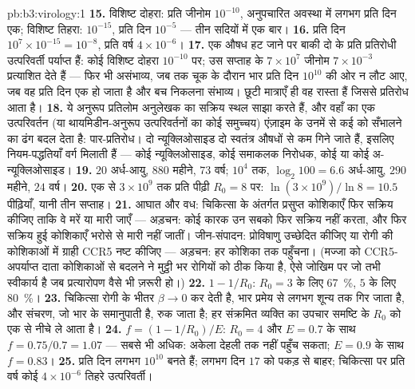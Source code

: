 \begin{solution}{pb:b3:virology:1}
\textbf{15.} विशिष्ट दोहरा: प्रति जीनोम $10^{-10}$, अनुपचारित अवस्था
में लगभग प्रति दिन एक; विशिष्ट तिहरा: $10^{-15}$, प्रति दिन $10^{-5}$
--- तीन सदियों में एक बार।
\textbf{16.} प्रति दिन $10^{7}\times 10^{-15} = 10^{-8}$, प्रति वर्ष
$4\times 10^{-6}$।
\textbf{17.} एक औषध हट जाने पर बाकी दो के प्रति प्रतिरोधी उत्परिवर्ती
पर्याप्त हैं: कोई विशिष्ट दोहरा $10^{-10}$ पर; उस सप्ताह के $7\times 10^{7}$
जीनोम $7\times 10^{-3}$ प्रत्याशित देते हैं --- फिर भी असंभाव्य,
जब तक चूक के दौरान भार प्रति दिन $10^{10}$ की ओर न लौट आए, जब वह प्रति
दिन एक हो जाता है और बच निकलना संभाव्य। छूटी मात्राएँ ही वह रास्ता हैं
जिससे प्रतिरोध आता है।
\textbf{18.} ये अनुरूप प्रतिलोम अनुलेखक का सक्रिय स्थल साझा करते हैं,
और वहाँ का एक उत्परिवर्तन (या थायमिडीन-अनुरूप उत्परिवर्तनों का कोई
समुच्चय) एंज़ाइम के उनमें से कई को सँभालने का ढंग बदल देता है:
पार-प्रतिरोध। दो न्यूक्लिओसाइड दो स्वतंत्र औषधों से कम गिने जाते हैं,
इसलिए नियम-पद्धतियाँ वर्ग मिलाती हैं --- कोई न्यूक्लिओसाइड, कोई समाकलक
निरोधक, कोई  या कोई अ-न्यूक्लिओसाइड।
\textbf{19.} $20$ अर्ध-आयु, $880$ महीने, $73$ वर्ष; $10^{4}$ तक,
$\log_{2}100 = 6.6$ अर्ध-आयु, $290$ महीने, $24$ वर्ष।
\textbf{20.} एक  से $3\times 10^{9}$ तक प्रति पीढ़ी $R_{0} = 8$
पर: $\ln(3\times 10^{9})/\ln 8 = 10.5$ पीढ़ियाँ, यानी तीन सप्ताह।
\textbf{21.} आघात और वध: चिकित्सा के अंतर्गत प्रसुप्त कोशिकाएँ फिर
सक्रिय कीजिए ताकि वे मरें या मारी जाएँ --- अड़चन: कोई कारक उन सबको फिर
सक्रिय नहीं करता, और फिर सक्रिय हुई कोशिकाएँ भरोसे से मारी नहीं जातीं।
जीन-संपादन: प्रोविषाणु उच्छेदित कीजिए या रोगी की कोशिकाओं में ग्राही
CCR5 नष्ट कीजिए --- अड़चन: हर कोशिका तक पहुँचना। (मज्जा को
CCR5-अपर्याप्त दाता कोशिकाओं से बदलने ने मुट्ठी भर रोगियों को ठीक किया
है, ऐसे जोखिम पर जो तभी स्वीकार्य है जब प्रत्यारोपण वैसे भी ज़रूरी हो।)
\textbf{22.} $1 - 1/R_{0}$: $R_{0} = 3$ के लिए \qty{67}{\%}, $5$ के लिए
\qty{80}{\%}।
\textbf{23.} चिकित्सा रोगी के भीतर $\beta \to 0$ कर देती है, भार प्रमेय
से लगभग शून्य तक गिर जाता है, और संचरण, जो भार के समानुपाती है, रुक
जाता है; हर संक्रमित व्यक्ति का उपचार समष्टि के $R_{0}$ को एक से नीचे
ले आता है।
\textbf{24.} $f = (1 - 1/R_{0})/E$: $R_{0} = 4$ और $E = 0.7$ के साथ $f =
0.75/0.7 = 1.07$ --- सबसे भी अधिक: अकेला  देहली तक नहीं पहुँच
सकता; $E = 0.9$ के साथ $f = 0.83$।
\textbf{25.} प्रति दिन लगभग $10^{10}$  बनते हैं; लगभग दिन
$17$ को पकड़ से बाहर; चिकित्सा पर प्रति वर्ष कोई $4\times 10^{-6}$
तिहरे उत्परिवर्ती।
\end{solution}
